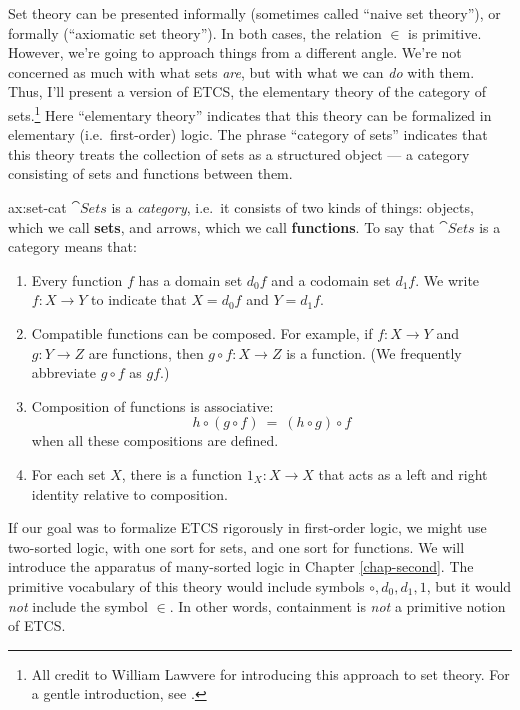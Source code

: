 Set theory can be presented informally (sometimes called ``naive set
theory''), or formally (``axiomatic set theory'').  In both cases, the
relation $\in$ is primitive.  However, we're going to approach things
from a different angle.  We're not concerned as much with what sets
{\it are}, but with what we can {\it do} with them.  Thus, I'll
present a version of ETCS, the elementary theory of the category of
sets.\footnote{All credit to William Lawvere for introducing this
  approach to set theory.  For a gentle introduction, see
  \citep{lawvere-sets}.}  Here ``elementary theory'' indicates that
this theory can be formalized in elementary (i.e.\ first-order) logic.
The phrase ``category of sets'' indicates that this theory treats the
collection of sets as a structured object --- a category consisting of
sets and functions between them.

\begin{axi}{ax:set-cat} $\cat{Sets}$ is a
  \emph{category}, i.e.\ it consists of two kinds of things: objects,
  which we call \textbf{sets}, and arrows, which we call
  \textbf{functions}.  To say that $\cat{Sets}$ is a category means
  that: 
\begin{enumerate}
\item Every function $f$ has a domain set $d_0f$ and a codomain set
  $d_1f$.  We write $f:X\to Y$ to indicate that $X=d_0f$ and $Y=d_1f$.
\item Compatible functions can be composed.  For example, if $f:X\to
  Y$ and $g:Y\to Z$ are functions, then $g\circ f:X\to Z$ is a
  function.  (We frequently abbreviate $g\circ f$ as $gf$.)
\item Composition of functions is associative:
\[ h\circ (g\circ f) \: = \: (h\circ g)\circ f \]
when all these compositions are defined.
\item For each set $X$, there is a function $1_X:X\to X$ that acts as
  a left and right identity relative to composition.
\end{enumerate}
\label{ax:set-cat} \end{axi}

\begin{disc} If our goal was to formalize ETCS rigorously in
  first-order logic, we might use two-sorted logic, with one sort for
  sets, and one sort for functions.  We will introduce the apparatus
  of many-sorted logic in Chapter \ref{chap-second}.  The primitive
  vocabulary of this theory would include symbols $\circ ,d_0,d_1,1$,
  but it would \textit{not} include the symbol $\in$.  In other words,
  containment is \textit{not} a primitive notion of ETCS. \end{disc}

